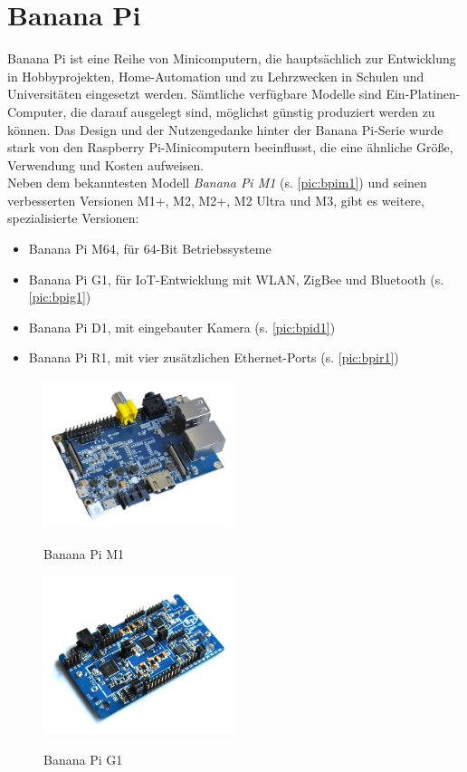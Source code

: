 \chapter{Banana Pi}

Banana Pi ist eine Reihe von Minicomputern, die hauptsächlich zur Entwicklung in Hobbyprojekten, Home-Automation und zu Lehrzwecken in Schulen und Universitäten eingesetzt werden.
Sämtliche verfügbare Modelle sind Ein-Platinen-Computer, die darauf ausgelegt sind, möglichst günstig produziert werden zu können. Das Design und der Nutzengedanke hinter der 
Banana Pi-Serie wurde stark von den Raspberry Pi-Minicomputern beeinflusst, die eine ähnliche Größe, Verwendung und Kosten aufweisen.
\\[1ex]
Neben dem bekanntesten Modell \textit{Banana Pi M1} (s. \autoref{pic:bpim1}) und seinen verbesserten Versionen M1+, M2, M2+, M2 Ultra und M3, gibt es weitere, spezialisierte Versionen:
\begin{itemize}
	\item Banana Pi M64, für 64-Bit Betriebssysteme
	\item Banana Pi G1, für \ac{IoT}-Entwicklung mit WLAN, ZigBee und Bluetooth (s. \autoref{pic:bpig1})
	\item Banana Pi D1, mit eingebauter Kamera (s. \autoref{pic:bpid1})
	\item Banana Pi R1, mit vier zusätzlichen Ethernet-Ports (s. \autoref{pic:bpir1})
\end{itemize}
\begin{figure}[!htbp]
\caption{Banana Pi M1}
\includegraphics[width=0.5\textwidth]{content/pictures/bpim1.jpg}
\label{pic:bpim1}
\end{figure}
\begin{figure}[!htbp]
\caption{Banana Pi G1}
\includegraphics[width=0.5\textwidth]{content/pictures/bpig1.jpg}
\label{pic:bpig1}
\end{figure}
